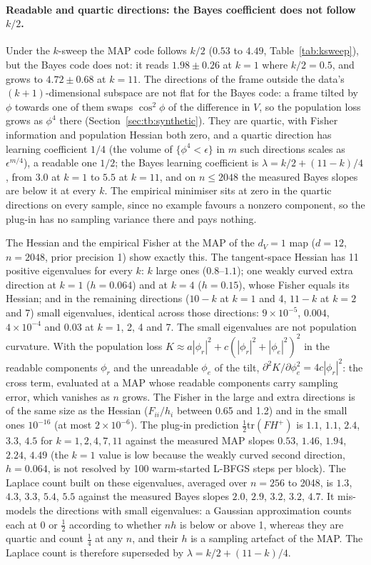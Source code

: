 \documentclass[11pt,a4paper]{article}
\newcommand{\dv}{d_V}
\begin{document}
\paragraph{Readable and quartic directions: the Bayes coefficient does not follow $k/2$.} Under the $k$-sweep the MAP code follows $k/2$ ($0.53$ to $4.49$, Table~\ref{tab:ksweep}), but the Bayes code does not: it reads $1.98\pm0.26$ at $k=1$ where $k/2=0.5$, and grows to $4.72\pm0.68$ at $k=11$. The directions of the frame outside the data's $(k+1)$-dimensional subspace are not flat for the Bayes code: a frame tilted by $\phi$ towards one of them swaps $\cos^2\!\phi$ of the difference in $V$, so the population loss grows as $\phi^4$ there (Section~\ref{sec:tb:synthetic}). They are quartic, with Fisher information and population Hessian both zero, and a quartic direction has learning coefficient $1/4$ (the volume of $\{\phi^4<\epsilon\}$ in $m$ such directions scales as $\epsilon^{m/4}$), a readable one $1/2$; the Bayes learning coefficient is $\lambda=k/2+(11-k)/4$, from $3.0$ at $k=1$ to $5.5$ at $k=11$, and on $n\le2048$ the measured Bayes slopes are below it at every $k$. The empirical minimiser sits at zero in the quartic directions on every sample, since no example favours a nonzero component, so the plug-in has no sampling variance there and pays nothing.

The Hessian and the empirical Fisher at the MAP of the $\dv=1$ map ($d=12$, $n=2048$, prior precision 1) show exactly this. The tangent-space Hessian has 11 positive eigenvalues for every $k$: $k$ large ones ($0.8$--$1.1$); one weakly curved extra direction at $k=1$ ($h=0.064$) and at $k=4$ ($h=0.15$), whose Fisher equals its Hessian; and in the remaining directions ($10-k$ at $k=1$ and 4, $11-k$ at $k=2$ and 7) small eigenvalues, identical across those directions: $9\times10^{-5}$, $0.004$, $4\times10^{-4}$ and $0.03$ at $k=1$, 2, 4 and 7. The small eigenvalues are not population curvature. With the population loss $K\approx a|\phi_r|^2+c(|\phi_r|^2+|\phi_e|^2)^2$ in the readable components $\phi_r$ and the unreadable $\phi_e$ of the tilt, $\partial^2K/\partial\phi_e^2=4c|\phi_r|^2$: the cross term, evaluated at a MAP whose readable components carry sampling error, which vanishes as $n$ grows. The Fisher in the large and extra directions is of the same size as the Hessian ($F_{ii}/h_i$ between 0.65 and 1.2) and in the small ones $10^{-16}$ (at most $2\times10^{-6}$). The plug-in prediction $\tfrac12\mathrm{tr}(FH^{+})$ is $1.1$, $1.1$, $2.4$, $3.3$, $4.5$ for $k=1,2,4,7,11$ against the measured MAP slopes $0.53$, $1.46$, $1.94$, $2.24$, $4.49$ (the $k=1$ value is low because the weakly curved second direction, $h=0.064$, is not resolved by 100 warm-started L-BFGS steps per block). The Laplace count built on these eigenvalues, averaged over $n=256$ to 2048, is $1.3$, $4.3$, $3.3$, $5.4$, $5.5$ against the measured Bayes slopes $2.0$, $2.9$, $3.2$, $3.2$, $4.7$. It mis-models the directions with small eigenvalues: a Gaussian approximation counts each at $0$ or $\tfrac12$ according to whether $nh$ is below or above 1, whereas they are quartic and count $\tfrac14$ at any $n$, and their $h$ is a sampling artefact of the MAP. The Laplace count is therefore superseded by $\lambda=k/2+(11-k)/4$.
\end{document}
